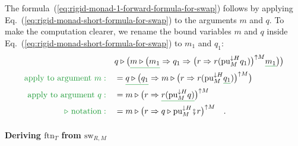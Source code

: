 The formula~(\ref{eq:rigid-monad-1-forward-formula-for-swap}) follows
by applying Eq.~(\ref{eq:rigid-monad-short-formula-for-swap}) to
the arguments $m$ and $q$. To make the computation clearer, we rename
the bound variables $m$ and $q$ inside Eq.~(\ref{eq:rigid-monad-short-formula-for-swap})
to $m_{1}$ and $q_{1}$:
\begin{align*}
 & q\triangleright\big(\gunderline{m\triangleright\big(m_{1}}\Rightarrow q_{1}\Rightarrow\big(r\Rightarrow r(\text{pu}_{M}^{\downarrow H}q_{1})\big)^{\uparrow M}\gunderline{m_{1}}\big)\big)\\
{\color{greenunder}\text{apply to argument }m:}\quad & =\gunderline{q\triangleright\big(q_{1}}\Rightarrow m\triangleright\big(r\Rightarrow r(\text{pu}_{M}^{\downarrow H}\gunderline{q_{1}})\big)^{\uparrow M}\big)\\
{\color{greenunder}\text{apply to argument }q:}\quad & =m\triangleright\big(r\Rightarrow\gunderline{r(\text{pu}_{M}^{\downarrow H}q)}\big)^{\uparrow M}\\
{\color{greenunder}\triangleright\text{ notation}:}\quad & =m\triangleright\big(r\Rightarrow q\triangleright\text{pu}_{M}^{\downarrow H}\bef r\big)^{\uparrow M}\quad.
\end{align*}


\paragraph{Deriving $\text{ftn}_{T}$ from $\text{sw}_{R,M}$}

